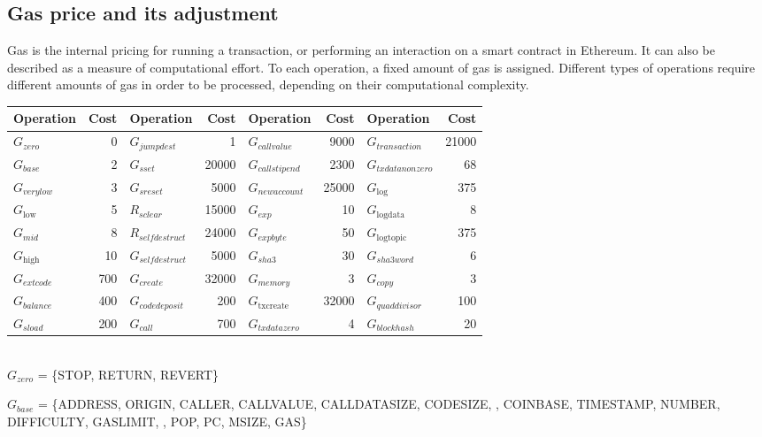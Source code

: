 \subsection*{Gas price and its adjustment} \label{section:gas}
Gas is the internal pricing for running a transaction, or performing an interaction on a smart contract in Ethereum. It can also be described as a measure of computational effort. To each operation, a fixed amount of gas is assigned. Different types of operations require different amounts of gas in order to be processed, depending on their computational complexity.

\begin{table}[H]
\begin{tabular}{| l  r | l  r | l  r | l  r |}
\hline
Operation & Cost & Operation & Cost & Operation & Cost& Operation & Cost\\
\hline
$G_{zero}$ & 0 & $G_{jumpdest}$ & 1 & $G_{callvalue}$ & 9000 &$G_{transaction}$ & 21000\\
$G_{base}$ & 2 & $G_{sset}$ & 20000 & $G_{callstipend}$ & 2300 &$G_{txdatanonzero}$ & 68\\
$G_{verylow}$ & 3 & $G_{sreset}$ & 5000 & $G_{newaccount}$ & 25000 &$G_{\mathrm{log}}$ & 375\\
$G_{\mathrm{low}}$ & 5 & $R_{sclear}$ & 15000 & $G_{exp}$ & 10 &$G_{\mathrm{logdata}}$ & 8\\
$G_{mid}$ & 8 & $R_{selfdestruct}$ & 24000 & $G_{expbyte}$ & 50 &$G_{\mathrm{logtopic}}$ & 375\\
$G_{\mathrm{high}}$ & 10 & $G_{selfdestruct}$ & 5000 &$G_{sha3}$ & 30 & $G_{sha3word}$ & 6\\
$G_{extcode}$ & 700 & $G_{create}$ & 32000 & $G_{memory}$ & 3 &$G_{copy}$ & 3\\
$G_{balance}$ & 400 & $G_{codedeposit}$ & 200 & $G_\text{txcreate}$ & 32000 & $G_{quaddivisor}$ & 100\\
$G_{sload}$ & 200 & $G_{call}$ & 700 & $G_{txdatazero}$ & 4 & $G_{blockhash}$ & 20\\
\hline
\end{tabular}
\\

$G_{zero}$ = \{{\small STOP}, {\small RETURN}, {\small REVERT}\}

$G_{base}$ = \{{\small ADDRESS}, {\small ORIGIN}, {\small CALLER}, {\small CALLVALUE}, {\small CALLDATASIZE}, {\small CODESIZE}, \newline \noindent\hspace*{2cm}{\small GASPRICE}, {\small COINBASE}, {\small TIMESTAMP}, {\small NUMBER}, {\small DIFFICULTY}, {\small GASLIMIT}, \newline \noindent\hspace*{2cm}{\small RETURNDATASIZE}, {\small POP}, {\small PC}, {\small MSIZE}, {\small GAS}\}


\end{table}
